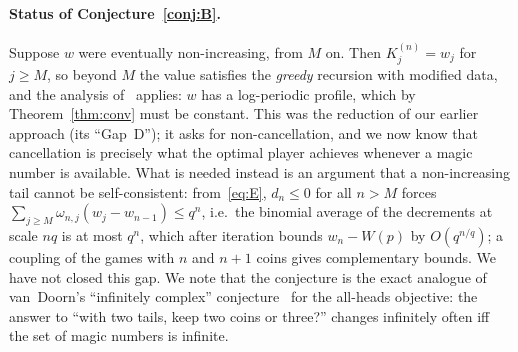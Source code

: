 \documentclass[11pt]{article}
\theoremstyle{definition}
\begin{document}
\paragraph{Status of Conjecture~\ref{conj:B}.}  Suppose $w$ were
eventually non-increasing, from $M$ on.  Then $K^{(n)}_j=w_j$ for
$j\ge M$, so beyond $M$ the value satisfies the \emph{greedy} recursion
with modified data, and the analysis of~\cite{Paper2} applies: $w$ has a
log-periodic profile, which by Theorem~\ref{thm:conv} must be
constant.  This was the reduction of our earlier approach (its
``Gap~D''); it asks for non-cancellation, and we now know that
cancellation is precisely what the optimal player achieves whenever a
magic number is available.  What is needed instead is an argument that
a non-increasing tail cannot be self-consistent: from~\eqref{eq:E},
$d_n\le0$ for all $n>M$ forces
$\sum_{j\ge M}\omega_{n,j}(w_j-w_{n-1})\le q^{n}$, i.e.\ the binomial
average of the decrements at scale $nq$ is at most $q^{n}$, which after
iteration bounds $w_n-W(p)$ by $O(q^{n/q})$; a coupling of the games
with $n$ and $n+1$ coins gives complementary bounds.  We have not
closed this gap.  We note that the conjecture is the exact analogue of
van~Doorn's ``infinitely complex'' conjecture~\cite[\S10]{vanDoorn} for
the all-heads objective: the answer to ``with two tails, keep two coins
or three?'' changes infinitely often iff the set of magic numbers is
infinite.
\end{document}

